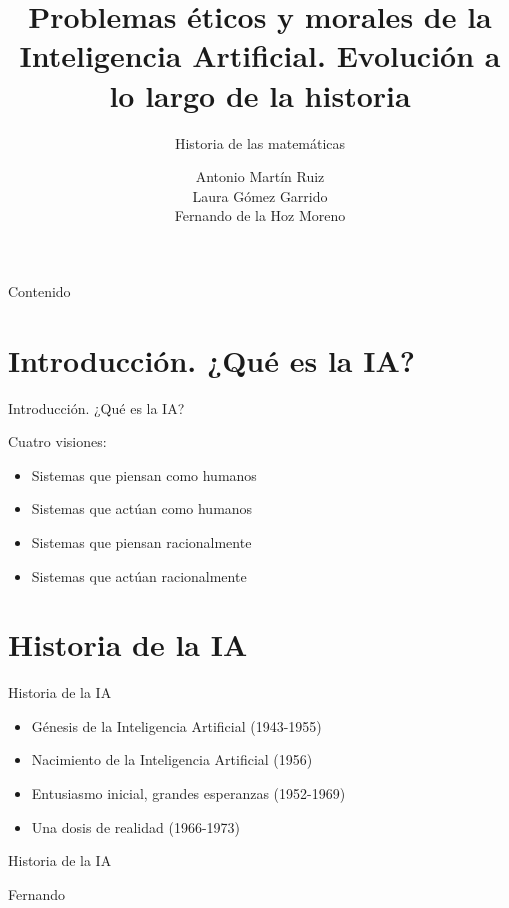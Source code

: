 \documentclass{beamer}
\title{Problemas éticos y morales de la
Inteligencia Artificial. Evolución a lo largo de la historia}
\subtitle{Historia de las matemáticas}
\author{Antonio Martín Ruiz \\ Laura Gómez Garrido \\ Fernando de la Hoz Moreno  }
\begin{document}
\begin{frame}
\titlepage
\end{frame}
\begin{frame}{Contenido}
  \tableofcontents
\end{frame}
\section{Introducción. ¿Qué es la IA?}

\begin{frame}{Introducción. ¿Qué es la IA?}

Cuatro visiones:

\begin{itemize}
\item Sistemas que piensan como humanos
\item Sistemas que actúan como humanos
\item Sistemas que piensan racionalmente
\item Sistemas que actúan racionalmente
\end{itemize}

\end{frame}

\section{Historia de la IA}

\begin{frame}{Historia de la IA}
\begin{itemize}
\item Génesis de la Inteligencia Artificial (1943-1955)
\item Nacimiento de la Inteligencia Artificial (1956)
\item Entusiasmo inicial, grandes esperanzas (1952-1969)
\item Una dosis de realidad (1966-1973)
\end{itemize}
\end{frame}

\begin{frame}{Historia de la IA}

Fernando

\end{frame}
\end{document}
